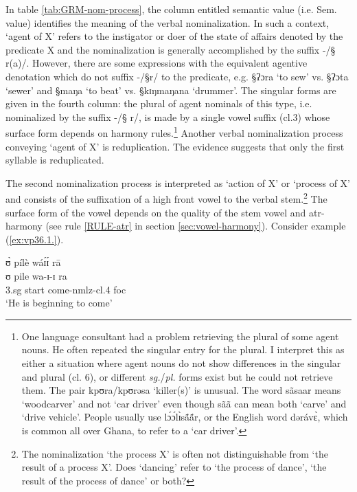 In table \ref{tab:GRM-nom-process}, the column entitled semantic value (i.e.
Sem. value)  identifies the meaning of the verbal nominalization. In such a
context, `agent of X'  refers to the instigator or doer of the state of affairs
denoted by  the predicate X and
the nominalization is generally accomplished by the suffix -/{\S
r(a)}/.  However,  there are some expressions with the equivalent
agentive denotation which
do
not suffix    -/{\S r}/  to the  predicate, e.g.  {\S ʔɔra} `to sew' vs.
{\S ʔɔta} `sewer' and {\S maŋa} `to beat' vs.  {\S kɪŋmaŋana} `drummer'.  The
singular forms  are given in the fourth column: 
the plural of agent nominals  of
this type, i.e. nominalized by the suffix -/{\S
r}/, is made by  a single vowel
suffix  ({\sc cl.3}) whose surface
form  depends on harmony rules.\footnote{One language consultant
had a problem retrieving the plural of some agent nouns. He often repeated the
singular entry
for the plural. I interpret this as  either a situation where agent nouns do
not show differences in the singular and plural ({\sc cl. 6}), or different {\it
sg.}/{\it pl.}
forms exist but he could not retrieve them. The pair {\F kpʊra}/{\F kpʊrəsa}
`killer(s)'   is unusual.  The word {\F
sãsaar} means
`woodcarver' and not `car driver'  even though {\F sãã} can mean both `carve'
and `drive vehicle'.  People usually use  {\F lɔ́ɔ́lɪ̀sã́ã́r}, or the English
word {\F dərávɛ̀}, 
 which is common all over Ghana, to refer to a `car driver'. } Another verbal
nominalization process conveying `agent of X' is reduplication. The evidence
suggests that  only the first syllable  is reduplicated.

The second nominalization process is  interpreted as `action of X' or
`process of X' and
consists of the suffixation of a  high front vowel to the verbal
 stem.\footnote{The nominalization `the process X' is often not distinguishable 
from
`the result of a process X'.  Does `dancing'  refer to `the process of dance', 
`the result of the process of dance' or both?} The surface form of the vowel
depends
on the quality of the stem vowel and {\sc atr}-harmony  (see
rule \ref{RULE-atr} in section \ref{sec:vowel-harmony}). 
Consider example (\ref{ex:vp36.1.}).


\begin{exe}
\ex\label{ex:vp36.1.}
\glll ʊ̀ pílè wáɪ́ɪ́ rā \\
ʊ pile wa-ɪ-ɪ ra \\
        {\sc 3.sg} start come-{\sc nmlz}-{\sc cl.4} {\sc foc}\\
\glt  `He is beginning to come'
\end{exe}

